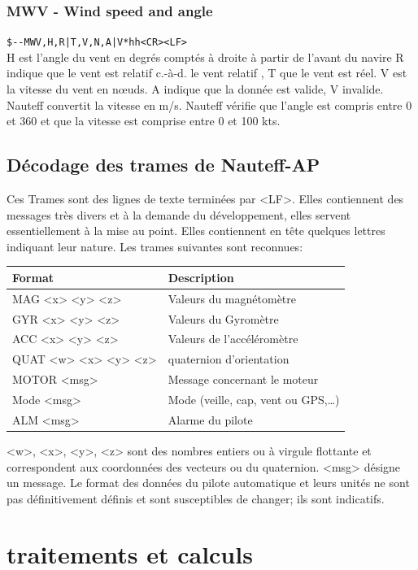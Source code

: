 \documentclass[a4paper,11pt]{report}
\begin{document}
\subsubsection{MWV - Wind speed and angle}
\texttt{\${-}{-}MWV,H,R|T,V,N,A|V*hh<CR><LF>}
\\
H est l'angle du vent en degrés comptés à droite à partir de l'avant du navire
R indique que le vent est relatif c.-à-d. le vent relatif , T que le vent est réel.
V est la vitesse du vent en nœuds.
A indique que la donnée est valide, V invalide.
Nauteff convertit la vitesse en m/s.
Nauteff vérifie que l'angle est compris entre 0 et 360 et que la vitesse est comprise entre 0 et 100 kts.


\subsection{Décodage des trames de Nauteff-AP}
Ces Trames sont des lignes de texte terminées par <LF>.
Elles contiennent des messages très divers et à la demande du développement,
elles servent essentiellement à la mise au point.
Elles contiennent en tête quelques lettres indiquant leur nature.
Les trames suivantes sont reconnues:

\begin{tabular}{l|l}
	Format & Description \\
	\hline 
	MAG  <x> <y> <z> & Valeurs du magnétomètre  \\ 
	\hline 
	GYR  <x> <y> <z> & Valeurs du  Gyromètre \\ 
	\hline 
	ACC  <x> <y> <z>     & Valeurs de l'accéléromètre \\ 
	\hline 
	QUAT  <w> <x> <y> <z>  & \Gls{quaternion} d'orientation \\ 
	\hline
	MOTOR <msg> & Message concernant le moteur \\ 
	\hline 
	Mode <msg>& Mode (veille, cap, vent ou GPS,\dots) \\ 
	\hline 
	ALM <msg> & Alarme du pilote \\ 
\end{tabular}

<w>, <x>, <y>, <z> sont des nombres entiers ou à virgule flottante
et correspondent aux coordonnées des vecteurs ou du quaternion.
<msg> désigne un message.
Le format des données du pilote automatique et leurs unités
ne sont pas définitivement définis et 
sont susceptibles de changer; ils sont indicatifs.

\section{traitements et calculs}
\end{document}
